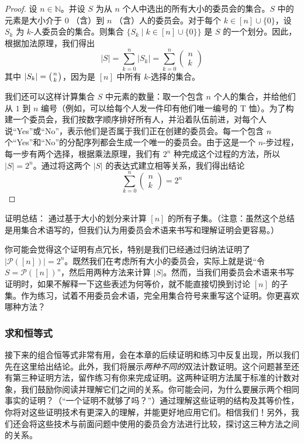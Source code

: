 \begin{proof}
    设 $n \in \mathbb{N}$。并设 $S$ 为从 $n$ 个人中选出的所有大小的委员会的集合。$S$ 中的元素是大小介于 $0$ （含）到 $n$ （含）人的委员会。对于每个 $k \in [n] \cup \{0\}$，设 $S_k$ 为 $k$-人委员会的集合。则集合 $\{S_k \mid k \in [n] \cup \{0\}\}$ 是 $S$ 的一个划分。因此，根据加法原理，我们得出
    \[|S| = \sum_{k=0}^{n} |S_k| = \sum_{k=0}^{n} \begin{pmatrix}n\\k\end{pmatrix} \]
    其中 $|S_k| = \big({n \atop k}\big)$，因为是 $[n]$ 中所有 $k$-选择的集合。

    我们还可以这样计算集合 $S$ 中元素的数量：取一个包含 $n$ 个人的集合，并给他们从 $1$ 到 $n$ 编号（例如，可以给每个人发一件印有他们唯一编号的 T 恤）。为了构建一个委员会，我们按数字顺序排好所有人，并沿着队伍前进，对每个人说``Yes''或``No''，表示他们是否属于我们正在创建的委员会。每一个包含 $n$ 个``Yes''和``No''的分配序列都会生成一个唯一的委员会。由于这是一个 $n$-步过程，每一步有两个选择，根据乘法原理，我们有 $2^n$ 种完成这个过程的方法，所以 $|S| = 2^n$。通过将这两个 $|S|$ 的表达式建立相等关系，我们得出结论
    \[\sum_{k=0}^{n} \begin{pmatrix}n\\k\end{pmatrix}=2^n\]
\end{proof}

\begin{questions}{证明总结：}
    通过基于大小的划分来计算 $[n]$ 的所有子集。（注意：虽然这个总结是用集合术语写的，但我们认为用委员会术语来书写和理解证明会更容易。）
\end{questions}

你可能会觉得这个证明有点冗长，特别是我们已经通过归纳法证明了 $|\mathcal{P}([n])| = 2^n$。既然我们在考虑所有大小的委员会，实际上就是说``令 $S = \mathcal{P}([n])$''，然后用两种方法来计算 $|S|$。然而，当我们用委员会术语来书写证明时，如果不解释一下这些表述为何等价，就不能直接切换到讨论 $[n]$ 的子集。作为练习，试着不用委员会术语，完全用集合符号来重写这个证明。你更喜欢哪种方法？

\subsubsection*{求和恒等式}

接下来的组合恒等式非常有用，会在本章的后续证明和练习中反复出现，所以我们先在这里给出结论。此外，我们将展示\emph{两种不同的}双法计数证明。这个问题甚至还有第三种证明方法，留作练习有你来完成证明。这两种证明方法属于标准的计数对象，我们鼓励你阅读并理解它们之间的关系。你可能会问，为什么要展示两个相同事实的证明？（``一个证明不就够了吗？''）通过理解这些证明的结构及其等价性，你将对这些证明技术有更深入的理解，并能更好地应用它们。相信我们！另外，我们还会将这些技术与前面问题中使用的委员会方法进行比较，探讨这三种方法之间的关系。

